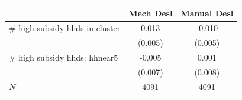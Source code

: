 \begin{tabular}{lcc}
\hline\hline
 & Mech Desl & Manual Desl \\
\hline
# high subsidy hhds in cluster & 0.013 & -0.010 \\
 & (0.005) & (0.005) \\
# high subsidy hhds: hhnear5 & -0.005 & 0.001 \\
 & (0.007) & (0.008) \\
\hline
$N$ & 4091 & 4091 \\
\hline\hline
\end{tabular}
